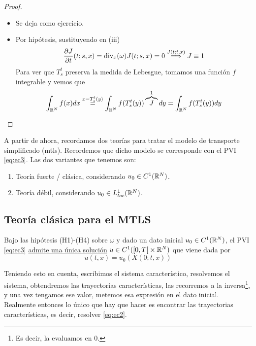\begin{proof}
\begin{itemize}
        \item[(iii)] Se deja como ejercicio.
        \item[(iv)] Por hipótesis, sustituyendo en (iii)
        $$\dfrac{\partial J}{\partial t}(t;s,x) = \text{div}_x(\omega)J(t;s,x) = 0 \stackrel{J(t;t,x)}{\Longrightarrow} J \equiv 1$$
        Para ver que $T_s^t$ preserva la medida de Lebesgue, tomamos una función $f$ integrable y vemos que 
        $$\int_{\mathbb{R}^N} f(x) dx \stackrel{x = T_s^t(y)}{=} \int_{\mathbb{R}^N} f(T_s^t(y)) \overbrace{J}^{1} dy = \int_{\mathbb{R}^N} f(T_s^t(y)) dy$$
    \end{itemize}
\end{proof}

A partir de ahora, recordamos dos teorías para tratar el modelo de transporte simplificado (mtls). Recordemos que dicho modelo se corresponde con el PVI \eqref{eq:ec3}. Las dos 
variantes que tenemos son:
\begin{enumerate}
    \item Teoría fuerte / clásica, considerando $u_0 \in C^1(\mathbb{R}^N)$.
    \item Teoría débil, considerando $u_0 \in L_{loc}^1(\mathbb{R}^N)$.
\end{enumerate}

\subsection{Teoría clásica para el MTLS}

\begin{teo}\label{teo:t1}
    Bajo las hipótesis (H1)-(H4) sobre $\omega$ y dado un dato inicial $u_0 \in C^1(\mathbb{R}^N)$, el PVI \eqref{eq:ec3} \underline{admite una única solución}
    $u \in C^1(\left[0, T \right[ \times \mathbb{R}^N)$ que viene dada por 
    $$\boxed{u(t,x) = u_0(X(0;t,x))}$$
\end{teo}

Teniendo esto en cuenta, escribimos el sistema característico, resolvemos el sistema, obtendremos las trayectorias características, las recorremos a la inversa\footnote{Es decir, la evaluamos en $0$.}, y una vez tengamos ese valor, metemos esa expresión en el dato inicial.
Realmente entonces lo único que hay que hacer es encontrar las trayectorias características, es decir, resolver \eqref{eq:ec2}. \\

